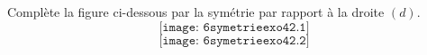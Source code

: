 Complète la figure ci-dessous par la symétrie par rapport à la droite $(d)$.
\[\texttt{[image: 6symetrieexo42.1]}\]
\[\texttt{[image: 6symetrieexo42.2]}\]